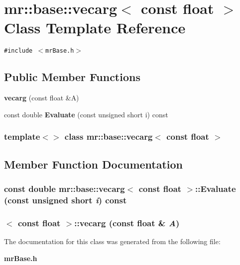 \section{mr::base::vecarg$<$ const float $>$ Class Template Reference}
\label{classmr_1_1base_1_1vecarg_3_01const_01float_01_4}
{\tt \#include $<$mr\-Base.h$>$}

\subsection*{Public Member Functions}
\begin{CompactItemize}
\item 
{\bf vecarg} (const float \&A)
\item 
const double {\bf Evaluate} (const unsigned short i) const 
\end{CompactItemize}
\subsubsection*{template$<$$>$ class mr::base::vecarg$<$ const float $>$}



\subsection{Member Function Documentation}
\subsubsection{\setlength{\rightskip}{0pt plus 5cm}const double {\bf mr::base::vecarg}$<$ const float $>$::Evaluate (const unsigned short {\em i}) const\hspace{0.3cm}{\tt  [inline]}}\label{classmr_1_1base_1_1vecarg_3_01const_01float_01_4_a1}


\subsubsection{$<$ const float $>$::{\bf vecarg} (const float \& {\em A})\hspace{0.3cm}{\tt  [inline]}}\label{classmr_1_1base_1_1vecarg_3_01const_01float_01_4_a0}




The documentation for this class was generated from the following file:\begin{CompactItemize}
\item 
{\bf mr\-Base.h}\end{CompactItemize}
